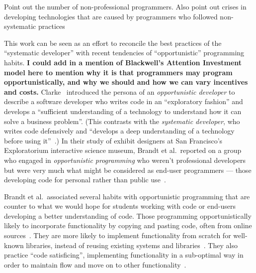 \documentclass[12pt]{memoir}
\title{}
\author{Andrew Head}
\begin{document}


Point out the number of non-professional programmers.
Also point out crises in developing technologies that are caused by programmers who followed non-systematic practices

This work can be seen as an effort to reconcile the best practices of the ``systematic developer'' with recent tendencies of ``opportunistic'' programming habits.
\textbf{I could add in a mention of Blackwell's Attention Investment model here to mention why it is that programmers may program opportunistically, and why we should and how we can vary incentives and costs.}
Clarke~\cite{clarke_what_2007} introduced the persona of an \emph{opportunistic developer} to describe a software developer who writes code in an ``exploratory fashion'' and develops a ``sufficient understanding of a technology to understand how it can solve a business problem''.
(This contrasts with the \emph{systematic developer}, who writes code defensively and ``develops a deep understanding of a technology before using it''~\cite{clarke_what_2007}.)
In their study of exhibit designers at San Francisco's Exploratorium interactive science museum, Brandt et al.\ reported on a group who engaged in \emph{opportunistic programming} who weren't professional developers~\cite{brandt_opportunistic_2008} but were very much what might be considered as end-user programmers --- those developing code for personal rather than public use~\cite{ko_state_2011}.

Brandt et al.\ associated several habits with opportunistic programming that are counter to what we would hope for students working with code or end-users developing a better understanding of code.
Those programming opportunistically likely to incorporate functionality by copying and pasting code, often from online sources~\cite{brandt_two_2009}.
They are more likely to implement functionality from scratch for well-known libraries, instead of reusing existing systems and libraries~\cite{brandt_opportunistic_2008}.
They also practice ``code satisficing'', implementing functionality in a sub-optimal way in order to maintain flow and move on to other functionality~\cite{brandt_opportunistic_2008}.
\end{document}
